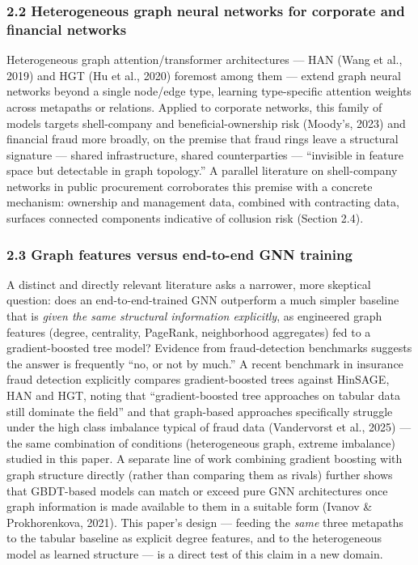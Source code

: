 \documentclass[11pt,]{article}
\begin{document}
\hypertarget{heterogeneous-graph-neural-networks-for-corporate-and-financial-networks}{%
\subsubsection{2.2 Heterogeneous graph neural networks for corporate and
financial
networks}\label{heterogeneous-graph-neural-networks-for-corporate-and-financial-networks}}

Heterogeneous graph attention/transformer architectures --- HAN (Wang et
al., 2019) and HGT (Hu et al., 2020) foremost among them --- extend
graph neural networks beyond a single node/edge type, learning
type-specific attention weights across metapaths or relations. Applied
to corporate networks, this family of models targets shell-company and
beneficial-ownership risk (Moody's, 2023) and financial fraud more
broadly, on the premise that fraud rings leave a structural signature
--- shared infrastructure, shared counterparties --- ``invisible in
feature space but detectable in graph topology.'' A parallel literature
on shell-company networks in public procurement corroborates this
premise with a concrete mechanism: ownership and management data,
combined with contracting data, surfaces connected components indicative
of collusion risk (Section 2.4).

\hypertarget{graph-features-versus-end-to-end-gnn-training}{%
\subsubsection{2.3 Graph features versus end-to-end GNN
training}\label{graph-features-versus-end-to-end-gnn-training}}

A distinct and directly relevant literature asks a narrower, more
skeptical question: does an end-to-end-trained GNN outperform a much
simpler baseline that is \emph{given the same structural information
explicitly}, as engineered graph features (degree, centrality, PageRank,
neighborhood aggregates) fed to a gradient-boosted tree model? Evidence
from fraud-detection benchmarks suggests the answer is frequently ``no,
or not by much.'' A recent benchmark in insurance fraud detection
explicitly compares gradient-boosted trees against HinSAGE, HAN and HGT,
noting that ``gradient-boosted tree approaches on tabular data still
dominate the field'' and that graph-based approaches specifically
struggle under the high class imbalance typical of fraud data
(Vandervorst et al., 2025) --- the same combination of conditions
(heterogeneous graph, extreme imbalance) studied in this paper. A
separate line of work combining gradient boosting with graph structure
directly (rather than comparing them as rivals) further shows that
GBDT-based models can match or exceed pure GNN architectures once graph
information is made available to them in a suitable form (Ivanov \&
Prokhorenkova, 2021). This paper's design --- feeding the \emph{same}
three metapaths to the tabular baseline as explicit degree features, and
to the heterogeneous model as learned structure --- is a direct test of
this claim in a new domain.
\end{document}
